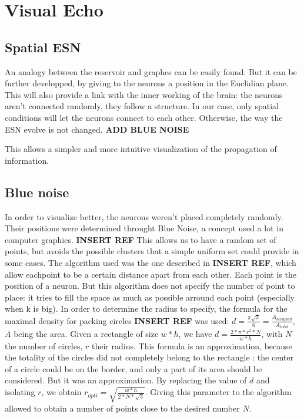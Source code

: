 \documentclass[11pt]{article}
\begin{document}
\section{Visual Echo}
  \subsection{Spatial ESN}
    An analogy between the reservoir and graphes can be easily found. But it can be further developped, by giving to the neurons a position in the Euclidian plane. This will also provide a link with the inner working of the brain: the neurons aren't connected randomly, they follow a structure. In our case, only spatial conditions will let the neurons connect to each other. Otherwise, the way the ESN evolve is not changed. \textbf{ADD BLUE NOISE}

    This allows a simpler and more intuitive visualization of the propagation of information.

  \subsection{Blue noise}
      In order to visualize better, the neurons weren't placed completely randomly. Their positions were determined throught Blue Noise, a concept used a lot in computer graphics. \textbf{INSERT REF} This allows us to have a random set of points, but avoids the possible clusters that a simple uniform set could provide in some cases. The algorithm used was the one described in \textbf{INSERT REF}, which allow eachpoint to be a certain distance apart from each other. Each point is the position of a neuron. But this algorithm does not specify the number of point to place: it tries to fill the space as much as possible arround each point (especially when k is big). In order to determine the radius to specify, the formula for the maximal density for packing circles \textbf{INSERT REF} was used: $d = \frac{\pi \sqrt{3}}{6} = \frac{A_{occupied}}{A_{total}}$, $A$ being the area. Given a rectangle of size $w * h$, we have $d = \frac{2* \pi * r^2 * N}{w * h}$, with $N$ the number of circles, $r$ their radius. This formula is an approximation, because the totality of the circles did not completely belong to the rectangle : the center of a circle could be on the border, and only a part of its area should be considered. But it was an approximation. By replacing the value of $d$ and isolating $r$, we obtain $r_{opti} = \sqrt{ \frac{w * h}{2 * N * \sqrt{3} } }$.
      Giving this parameter to the algorithm allowed to obtain a number of points close to the desired number $N$.
\end{document}
